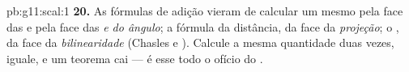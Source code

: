 \begin{solution}{pb:g11:scal:1}
\textbf{20.} As fórmulas de adição vieram de calcular um mesmo
 pela face das \emph{} e pela face
das \emph{ e do ângulo}; a fórmula da distância, da face
da \emph{projeção}; o , da face da
\emph{bilinearidade} (Chasles e ). Calcule a mesma
quantidade duas vezes, iguale, e um teorema cai --- é esse todo
o ofício do .
\end{solution}
